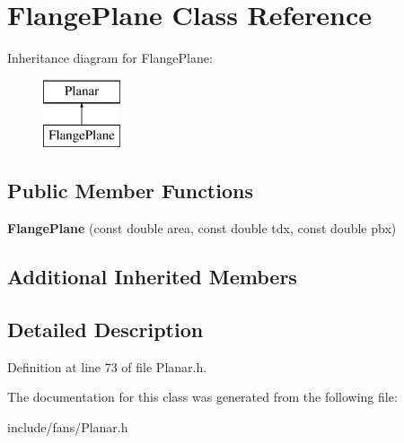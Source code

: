\hypertarget{class_flange_plane}{}\section{Flange\+Plane Class Reference}
\label{class_flange_plane}
Inheritance diagram for Flange\+Plane\+:\begin{figure}[H]
\begin{center}
\leavevmode
\includegraphics[height=2.000000cm]{d0/de9/class_flange_plane}
\end{center}
\end{figure}
\subsection*{Public Member Functions}
\begin{DoxyCompactItemize}
\item 
\mbox{\label{class_flange_plane_a124814f4e579d4e0b415190e144147e6}} 
{\bfseries Flange\+Plane} (const double area, const double tdx, const double pbx)
\end{DoxyCompactItemize}
\subsection*{Additional Inherited Members}


\subsection{Detailed Description}


Definition at line 73 of file Planar.\+h.



The documentation for this class was generated from the following file\+:\begin{DoxyCompactItemize}
\item 
include/fans/Planar.\+h\end{DoxyCompactItemize}
